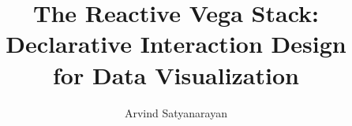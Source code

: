 \documentclass[12pt,twoside,openleft]{report}
\begin{document}
\title{The Reactive Vega Stack:\\Declarative Interaction Design\\for Data
Visualization}
\author{Arvind Satyanarayan}

\tablespagefalse

\beforepreface


\afterpreface











\end{document}
